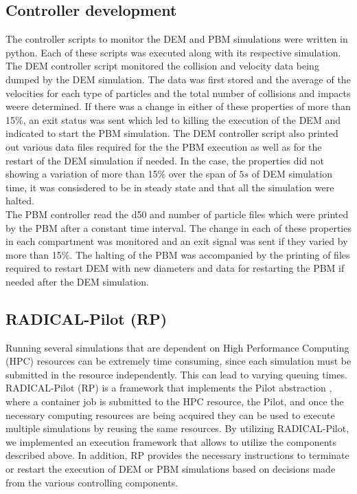 \documentclass[fleqn,twoside,10pt]{article}
\begin{document}
\subsection{Controller development}
The controller scripts to monitor the DEM and PBM simulations were written in python. Each of these 
scripts was executed along with its respective simulation. The DEM controller script monitored the 
collision and velocity data being dumped by the DEM simulation. The data was first stored and the 
average of the velocities for each type of particles and the total number of collisions and impacts 
weere determined. If there was a change in either of these properties of more than 15\%, an exit 
status was sent which led to killing the execution of the DEM and indicated to start the PBM 
simulation. The DEM controller script also printed out various data files required for the the PBM 
execution as well as for the restart of the DEM simulation if needed. In the case, the properties did  
not showing a variation of more than 15\% over the span of $5s$ of DEM simulation time, it was 
consisdered to be in steady state and that all the simulation were halted.\\
The PBM controller read the d50 and number of particle files which were printed by the PBM after a 
constant time interval. The change in each of these properties in each compartment was monitored 
and an exit signal was sent if they varied by more than 15\%. The halting of the PBM was accompanied 
by the printing of files required to restart DEM with new diameters and data for restarting the PBM 
if needed after the DEM simulation.  

\subsection{RADICAL-Pilot (RP)}
Running several simulations that are dependent on High Performance Computing (HPC) resources can 
be extremely time consuming, since each simulation must be submitted in the resource independently.
This can lead to varying queuing times. RADICAL-Pilot (RP) is a framework that implements the Pilot 
abstraction \cite{pstar12}, where a container job is submitted to the HPC resource, the Pilot,
and once the necessary computing resources are being acquired they can be used to execute multiple
simulations by reusing the same resources. By utilizing RADICAL-Pilot, we implemented an execution
framework that allows to utilize the components described above. In addition, RP provides the necessary
instructions to terminate or restart the execution of DEM or PBM simulations based on decisions
made from the various controlling components.
\end{document}
